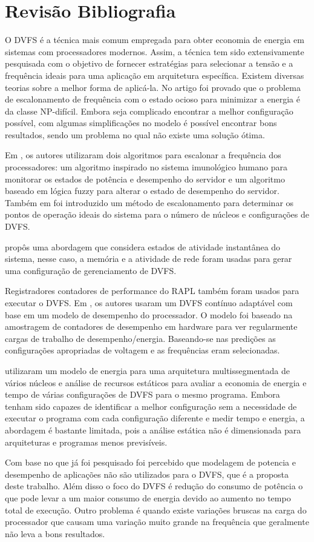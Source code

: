 \chapter{Revisão Bibliografia} \label{cap:revisao_bibliografica}

O DVFS é a técnica mais comum empregada para obter economia de energia em sistemas com processadores modernos. Assim, a técnica tem sido extensivamente pesquisada com o objetivo de fornecer estratégias para selecionar a tensão e a frequência ideais para uma aplicação em arquitetura específica. Existem diversas teorias sobre a melhor forma de aplicá-la. No artigo \cite{Albers2014} foi provado que o problema de escalonamento de frequência com o estado ocioso para minimizar a energia é da classe NP-difícil. Embora seja complicado encontrar a melhor configuração possível, com algumas simplificações no modelo é possível encontrar bons resultados, sendo um problema  no qual não existe uma solução ótima.

Em \cite {Anghel2011}, os autores utilizaram dois algoritmos para escalonar a frequência dos processadores: um algoritmo inspirado no sistema imunológico humano para monitorar os estados de potência e desempenho do servidor e um algoritmo baseado em lógica fuzzy para alterar o estado de desempenho do servidor. Também em \cite{Cochran2011} foi introduzido um método de escalonamento para determinar os pontos de operação ideais do sistema para o número de núcleos e configurações de DVFS.

\cite{DaCosta2015} propôs uma abordagem que considera estados de atividade instantânea do sistema, nesse caso, a memória e a atividade de rede foram usadas para gerar uma configuração de gerenciamento de DVFS. 

Registradores contadores de performance do RAPL também foram usados para executar o DVFS. Em \cite{Spiliopoulos2011}, os autores usaram um DVFS contínuo adaptável com base em um modelo de desempenho do processador. O modelo foi baseado na amostragem de contadores de desempenho em hardware para ver regularmente cargas de trabalho de desempenho/energia. Baseando-se nas predições as configurações apropriadas de voltagem e as frequências eram selecionadas.

\cite{Georgiou:2017} utilizaram um modelo de energia para uma arquitetura multissegmentada de vários núcleos e análise de recursos estáticos para avaliar a economia de energia e tempo de várias configurações de DVFS para o mesmo programa. Embora tenham sido capazes de identificar a melhor configuração sem a necessidade de executar o programa com cada configuração diferente e medir tempo e energia, a abordagem é bastante limitada, pois a análise estática não é dimensionada para arquiteturas e programas menos previsíveis.


Com base no que já foi pesquisado foi percebido que modelagem de potencia e desempenho de aplicações não são utilizados para o DVFS, que é a proposta deste trabalho. Além disso o foco do DVFS é redução do consumo de potência o que pode levar a um maior consumo de energia devido ao aumento no tempo total de execução. Outro problema é quando existe variações bruscas na carga do processador que causam uma variação muito grande na frequência que geralmente não leva a bons resultados.